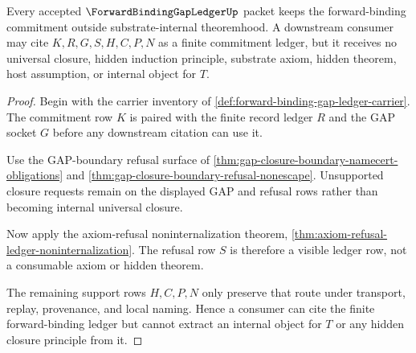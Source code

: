 \begin{theorem}
\label{thm:forward-binding-gap-ledger-noninternalization}
Every accepted $\ForwardBindingGapLedgerUp$ packet keeps the forward-binding commitment outside substrate-internal theoremhood. A downstream consumer may cite $K,R,G,S,H,C,P,N$ as a finite commitment ledger, but it receives no universal closure, hidden induction principle, substrate axiom, hidden theorem, host assumption, or internal object for $T$.
\end{theorem}
\begin{proof}
Begin with the carrier inventory of \autoref{def:forward-binding-gap-ledger-carrier}. The commitment row $K$ is paired with the finite record ledger $R$ and the GAP socket $G$ before any downstream citation can use it.

Use the GAP-boundary refusal surface of \autoref{thm:gap-closure-boundary-namecert-obligations} and \autoref{thm:gap-closure-boundary-refusal-nonescape}. Unsupported closure requests remain on the displayed GAP and refusal rows rather than becoming internal universal closure.

Now apply the axiom-refusal noninternalization theorem, \autoref{thm:axiom-refusal-ledger-noninternalization}. The refusal row $S$ is therefore a visible ledger row, not a consumable axiom or hidden theorem.

The remaining support rows $H,C,P,N$ only preserve that route under transport, replay, provenance, and local naming. Hence a consumer can cite the finite forward-binding ledger but cannot extract an internal object for $T$ or any hidden closure principle from it.
\end{proof}

